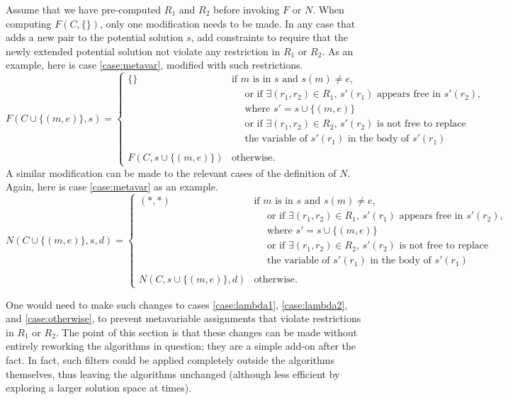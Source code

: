 \documentclass{article}
\begin{document}
Assume that we have pre-computed $R_1$ and $R_2$ before invoking $F$ or $N$.  When computing $F(C,\{\})$, only one modification needs to be made.  In any case that adds a new pair to the potential solution $s$, add constraints to require that the newly extended potential solution not violate any restriction in $R_1$ or $R_2$.  As an example, here is case \ref{case:metavar}, modified with such restrictions.
	$$
       	F(C\cup\{(m,e)\},s) = \left\{
           	\begin{array}{ll}
                \{\} & \text{if $m$ is in $s$ and $s(m)\neq e$,} \\
                	 & \text{~ ~ or if $\exists(r_1,r_2)\in R_1$, $s'(r_1)$ appears free in $s'(r_2)$,} \\
	 				 & \text{~ ~ where $s'=s\cup\{(m,e)\}$} \\
                	 & \text{~ ~ or if $\exists(r_1,r_2)\in R_2$, $s'(r_2)$ is not free to replace} \\
	 				 & \text{~ ~ the variable of $s'(r_1)$ in the body of $s'(r_1)$} \\
                & \\
                F(C,s\cup\{(m,e)\}) & \text{otherwise.}
            \end{array}
        \right.
    $$
A similar modification can be made to the relevant cases of the definition of $N$.  Again, here is case \ref{case:metavar} as an example.
	$$
        N(C\cup\{(m,e)\},s,d) = \left\{
    	   	\begin{array}{ll}
                (*,*)					& \text{if $m$ is in $s$ and $s(m)\neq e$,} \\
                	 & \text{~ ~ or if $\exists(r_1,r_2)\in R_1$, $s'(r_1)$ appears free in $s'(r_2)$,} \\
	 				 & \text{~ ~ where $s'=s\cup\{(m,e)\}$} \\
                	 & \text{~ ~ or if $\exists(r_1,r_2)\in R_2$, $s'(r_2)$ is not free to replace} \\
	 				 & \text{~ ~ the variable of $s'(r_1)$ in the body of $s'(r_1)$} \\
                & \\
                N(C,s\cup\{(m,e)\},d)	& \text{otherwise.}
            \end{array}
        \right.
    $$

One would need to make such changes to cases \ref{case:lambda1}, \ref{case:lambda2}, and \ref{case:otherwise}, to prevent metavariable assignments that violate restrictions in $R_1$ or $R_2$.  The point of this section is that these changes can be made without entirely reworking the algorithms in question; they are a simple add-on after the fact.  In fact, such filters could be applied completely outside the algorithms themselves, thus leaving the algorithms unchanged (although less efficient by exploring a larger solution space at times).
\end{document}
